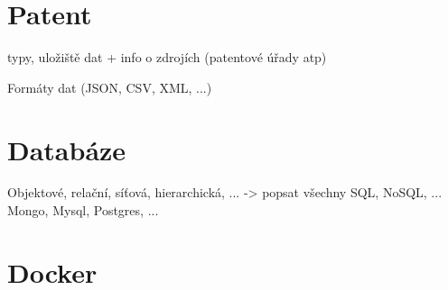 \chapter{Patent}
typy, uložiště dat + info o zdrojích (patentové úřady atp)

Formáty dat (JSON, CSV, XML, ...)



\chapter{Databáze}
Objektové, relační, síťová, hierarchická, ... -> popsat všechny\newline
SQL, NoSQL, ...\newline
Mongo, Mysql, Postgres, ...



\chapter{Docker}